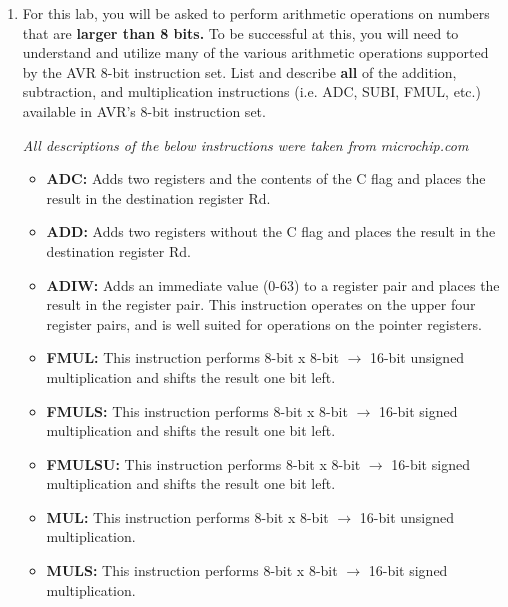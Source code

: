 \documentclass[12pt,letterpaper]{article}
\begin{document}
	\begin{enumerate}
		\item 
		For this lab, you will be asked to perform arithmetic operations on numbers that are \textbf{larger than 8 bits.} 
		To be successful at this, you will need to understand and utilize many of the various arithmetic operations supported by the AVR 8-bit instruction set. 
		List and describe \textbf{all} of the addition, subtraction, and multiplication instructions (i.e. ADC, SUBI, FMUL, etc.) available in AVR’s 8-bit instruction set.
		
		\textit{All descriptions of the below instructions were taken from microchip.com \cite{micro}}
		
		\begin{itemize}
			\item 
			\textbf{ADC:} Adds two registers and the contents of the C flag and places the result in the destination register Rd.
			
			\item 
			\textbf{ADD:} Adds two registers without the C flag and places the result in the destination register Rd.
			
			\item 
			\textbf{ADIW:} Adds an immediate value (0-63) to a register pair and places the result in the register pair. This instruction operates on the upper four register pairs, and is well suited for operations on the pointer registers.
			
			\item 
			\textbf{FMUL:} This instruction performs 8-bit x 8-bit $\rightarrow$ 16-bit unsigned multiplication and shifts the result one bit left.
			
			\item 
			\textbf{FMULS:} This instruction performs 8-bit x 8-bit $\rightarrow$ 16-bit signed multiplication and shifts the result one bit left.
			
			\item 
			\textbf{FMULSU:} This instruction performs 8-bit x 8-bit $\rightarrow$ 16-bit signed multiplication and shifts the result one bit left.
			
			\item 
			\textbf{MUL:} This instruction performs 8-bit x 8-bit $\rightarrow$ 16-bit unsigned multiplication.
			
			\item 
			\textbf{MULS:} This instruction performs 8-bit x 8-bit $\rightarrow$ 16-bit signed multiplication.
			

\end{itemize}
\end{enumerate}
\end{document}
